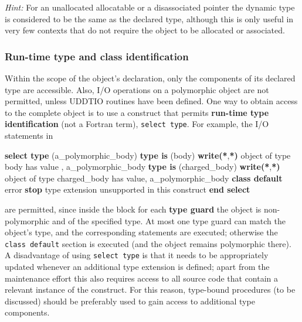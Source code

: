 \documentclass[
  paper=a4,
  ,captions=tableheading
]{scrartcl}
\newenvironment{Shaded}{\begin{snugshade}}{\end{snugshade}}
\newcommand{\FunctionTok}[1]{\textcolor[rgb]{0.13,0.29,0.53}{\textbf{#1}}}
\newcommand{\KeywordTok}[1]{\textcolor[rgb]{0.13,0.29,0.53}{\textbf{#1}}}
\newcommand{\NormalTok}[1]{#1}
\newcommand{\StringTok}[1]{\textcolor[rgb]{0.31,0.60,0.02}{#1}}
\begin{document}
\emph{Hint:} For an unallocated allocatable or a disassociated pointer
the dynamic type is considered to be the same as the declared type,
although this is only useful in very few contexts that do not require
the object to be allocated or associated.

\subsubsection{Run-time type and class
identification}\label{run-time-type-and-class-identification}

Within the scope of the object's declaration, only the components of its
declared type are accessible. Also, I/O operations on a polymorphic
object are not permitted, unless UDDTIO routines have been defined. One
way to obtain access to the complete object is to use a construct that
permits \textbf{run-time type identification} (not a Fortran term),
\texttt{select\ type}. For example, the I/O statements in

\begin{Shaded}
\begin{Highlighting}[]
\KeywordTok{select type}\NormalTok{ (a\_polymorphic\_body)}
\KeywordTok{type is}\NormalTok{ (body)}
   \FunctionTok{write(*}\NormalTok{,}\FunctionTok{*)} \StringTok{\textquotesingle{}object of type body has value        \textquotesingle{}}\NormalTok{, a\_polymorphic\_body}
\KeywordTok{type is}\NormalTok{ (charged\_body)}
   \FunctionTok{write(*}\NormalTok{,}\FunctionTok{*)} \StringTok{\textquotesingle{}object of type charged\_body has value\textquotesingle{}}\NormalTok{, a\_polymorphic\_body}
\KeywordTok{class default}
\NormalTok{   error }\KeywordTok{stop} \StringTok{\textquotesingle{}type extension unsupported in this construct\textquotesingle{}}
\KeywordTok{end select}
\end{Highlighting}
\end{Shaded}

are permitted, since inside the block for each \textbf{type guard} the
object is non-polymorphic and of the specified type. At most one type
guard can match the object's type, and the corresponding statements are
executed; otherwise the \texttt{class\ default} section is executed (and
the object remains polymorphic there). A disadvantage of using
\texttt{select\ type} is that it needs to be appropriately updated
whenever an additional type extension is defined; apart from the
maintenance effort this also requires access to all source code that
contain a relevant instance of the construct. For this reason,
type-bound procedures (to be discussed) should be preferably used to
gain access to additional type components.
\end{document}
